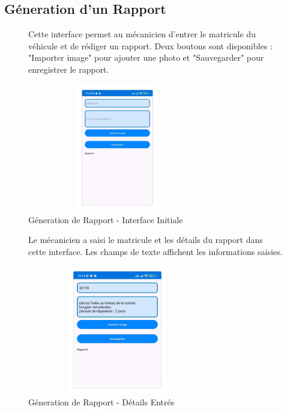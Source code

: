 \subsection{Géneration d'un Rapport}
\begin{figure}[htbp]
    \centering
    \begin{minipage}{0.58\textwidth}
        \raggedright
        Cette interface permet au mécanicien d'entrer le matricule du véhicule et de rédiger un rapport. Deux boutons sont disponibles : "Importer image" pour ajouter une photo et "Sauvegarder" pour enregistrer le rapport.
    \end{minipage}
    \hfill
    \begin{minipage}{0.39\textwidth}
        \centering
        \includegraphics[width=0.7\textwidth,height=5.6cm]{chap5.images/r1.png}
        \caption{\centering Géneration de Rapport - Interface Initiale }
    \end{minipage}
\end{figure}

\begin{figure}[htbp]
    \centering
    \begin{minipage}{0.58\textwidth}
        \raggedright
        Le mécanicien a saisi le matricule et les détails du rapport dans cette interface. Les champs de texte affichent les informations saisies.
    \end{minipage}
    \hfill
    \begin{minipage}{0.39\textwidth}
        \centering
        \includegraphics[width=0.7\textwidth,height=5.6cm]{chap5.images/r2.png}
        \caption{\centering Géneration de Rapport - Détails Entrés }
    \end{minipage}
\end{figure}

